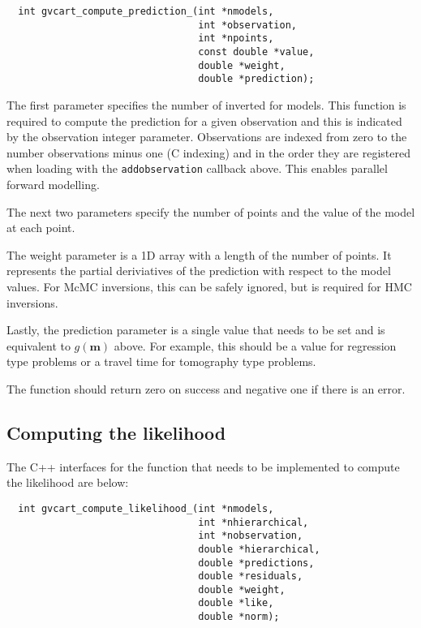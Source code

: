 \documentclass[a4paper,12pt]{article}
\begin{document}
\begin{verbatim}
  int gvcart_compute_prediction_(int *nmodels,
                                 int *observation,
                                 int *npoints, 
                                 const double *value,
                                 double *weight,
                                 double *prediction);
\end{verbatim}

The first parameter specifies the number of inverted for models. This
function is required to compute the prediction for a given observation
and this is indicated by the observation integer parameter. Observations
are indexed from zero to the number observations minus one (C indexing) and
in the order they are registered when loading with the \texttt{addobservation}
callback above. This enables parallel forward modelling.

The next two parameters specify the number of points and the value of
the model at each point.

The weight parameter is a 1D array with a length of the number of points. It
represents the partial deriviatives of the prediction with respect to the
model values. For McMC inversions, this can be safely ignored, but is required
for HMC inversions.

Lastly, the prediction parameter is a single value that needs to be set and
is equivalent to $g(\mathbf{m})$ above. For example, this should be a value for
regression type problems or a travel time for tomography type problems.

The function should return zero on success and negative one if there
is an error.

\subsection{Computing the likelihood}

The C++ interfaces for the function that needs to be implemented to
compute the likelihood are below:

\begin{verbatim}
  int gvcart_compute_likelihood_(int *nmodels,
                                 int *nhierarchical,
                                 int *nobservation,
                                 double *hierarchical,
                                 double *predictions, 
                                 double *residuals,
                                 double *weight,
                                 double *like,
                                 double *norm);
\end{verbatim}
\end{document}
